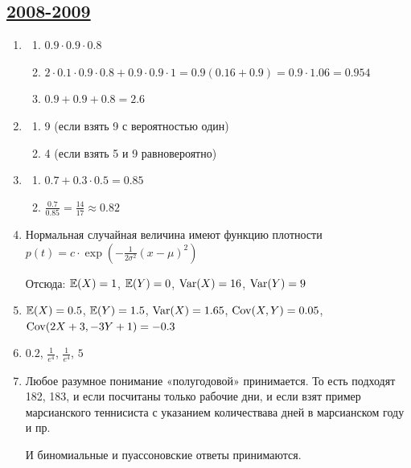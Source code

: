 \subsection[2008-2009]{\hyperref[sec:kr_01_2008_2009]{2008-2009}}
\label{sec:sol_kr_01_2008_2009}

\begin{enumerate}
\item
\begin{enumerate}
\item $0.9 \cdot 0.9 \cdot 0.8$
\item $2 \cdot 0.1 \cdot 0.9 \cdot 0.8 + 0.9 \cdot 0.9 \cdot 1 = 0.9(0.16 + 0.9) =
0.9 \cdot 1.06 = 0.954$
\item $0.9 + 0.9 + 0.8 = 2.6$
\end{enumerate}
\item
\begin{enumerate}
\item 9 (если взять 9 с вероятностью один)
\item 4 (если взять 5 и 9 равновероятно)
\end{enumerate}
\item
\begin{enumerate}
\item $0.7 + 0.3 \cdot 0.5 = 0.85$
\item $\frac{0.7}{0.85} = \frac{14}{17} \approx 0.82$
\end{enumerate}
\item Нормальная случайная величина имеют функцию плотности $p(t) = c \cdot
\exp(-\frac{1}{2\sigma^{2}}(x - \mu)^{2})$

Отсюда: $\operatorname{\mathbb{E}}(X) = 1$, $\operatorname{\mathbb{E}}(Y) = 0$, $\operatorname{Var}(X) = 16$, $\operatorname{Var}(Y) = 9$
\item $\operatorname{\mathbb{E}}(X) = 0.5$, $\operatorname{\mathbb{E}}(Y) = 1.5$, $\operatorname{Var}(X) = 1.65$, $\operatorname{Cov}(X,Y) = 0.05$,
$\operatorname{Cov}(2X + 3, -3Y + 1) = -0.3$
\item $0.2$, $\frac{1}{e^4}$, $\frac{1}{e^4}$, $5$
\item Любое разумное понимание «полугодовой» принимается. То есть подходят 182,
183, и если посчитаны только рабочие дни, и если взят пример марсианского теннисиста
с указанием количествава дней в марсианском году и пр.

И биномиальные и пуассоновские ответы принимаются.


\end{enumerate}
